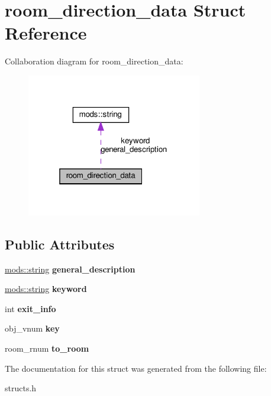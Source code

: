 \hypertarget{structroom__direction__data}{}\section{room\+\_\+direction\+\_\+data Struct Reference}
\label{structroom__direction__data}


Collaboration diagram for room\+\_\+direction\+\_\+data\+:\nopagebreak
\begin{figure}[H]
\begin{center}
\leavevmode
\includegraphics[width=217pt]{structroom__direction__data__coll__graph}
\end{center}
\end{figure}
\subsection*{Public Attributes}
\begin{DoxyCompactItemize}
\item 
\mbox{\label{structroom__direction__data_a5ccc990bafbd9b5ba8c0fbee5c15a3a9}} 
\hyperlink{structmods_1_1string}{mods\+::string} {\bfseries general\+\_\+description}
\item 
\mbox{\label{structroom__direction__data_aa788254813864106c781808a382e6c37}} 
\hyperlink{structmods_1_1string}{mods\+::string} {\bfseries keyword}
\item 
\mbox{\label{structroom__direction__data_ad4e0b315a7b257e243a46493c820e690}} 
int {\bfseries exit\+\_\+info}
\item 
\mbox{\label{structroom__direction__data_a8eafc6e176dd09ac2e6ecc568c6261f8}} 
obj\+\_\+vnum {\bfseries key}
\item 
\mbox{\label{structroom__direction__data_a91f22f34abae70aed980bdffd6b50810}} 
room\+\_\+rnum {\bfseries to\+\_\+room}
\end{DoxyCompactItemize}


The documentation for this struct was generated from the following file\+:\begin{DoxyCompactItemize}
\item 
structs.\+h\end{DoxyCompactItemize}
